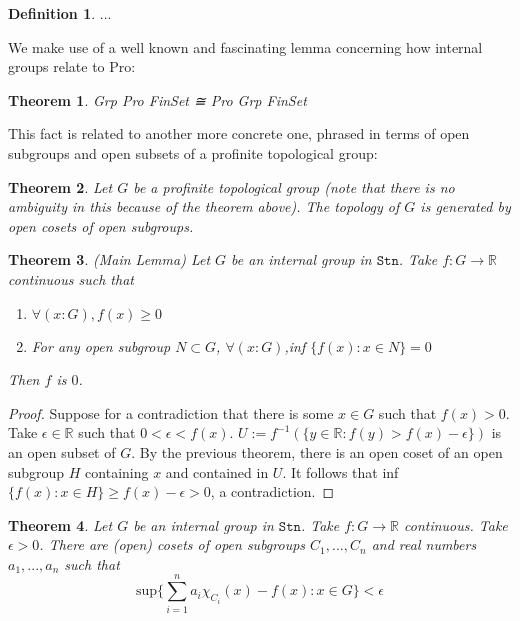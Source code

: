 \documentclass[13pt]{amsart}
\newtheorem{theorem}{Theorem}
\theoremstyle{definition}
\newtheorem{definition}{Definition}
\begin{document}
\begin{definition}
...
\end{definition}

We make use of a well known and fascinating lemma concerning how internal groups relate to Pro:

\begin{theorem}
Grp Pro FinSet ≅ Pro Grp FinSet
\end{theorem}

This fact is related to another more concrete one, phrased in terms of open subgroups and open subsets of a profinite topological group:

\begin{theorem}
Let $G$ be a profinite topological group (note that there is no ambiguity in this because of the theorem above). The topology of $G$ is generated by open cosets of open subgroups.
\end{theorem}

\begin{theorem} (Main Lemma)
Let $G$ be an internal group in $\texttt{Stn}$. Take $f : G \rightarrow \mathbb{R}$ continuous such that 
\begin{enumerate}
\item $\forall (x : G),f(x) \geq 0$
\item For any open subgroup $N \subset G$, $\forall (x:G)$,inf $\{ f(x) : x \in N \} = 0$
\end{enumerate}
Then $f$ is $0$.
\end{theorem}

\begin{proof}
Suppose for a contradiction that there is some $x \in G$ such that $f(x) > 0$. Take $\epsilon \in \mathbb{R}$ such that $0 < \epsilon < f(x)$. $U := f^{-1}(\{ y \in \mathbb{R} : f(y) > f(x) - \epsilon \})$ is an open subset of $G$. By the previous theorem, there is an open coset of an open subgroup $H$ containing $x$ and contained in $U$. It follows that inf $\{ f(x) : x \in H \} \geq f(x) - \epsilon > 0 $, a contradiction.
\end{proof}

\begin{theorem}
Let $G$ be an internal group in $\texttt{Stn}$. Take $f : G \rightarrow \mathbb{R}$ continuous. Take $\epsilon > 0$. There are (open) cosets of open subgroups $C_1, ...,C_n$ and real numbers $a_1, ..., a_n$ such that 
\[ \text{sup} \{  \sum_{i = 1}^{n} a_i \chi_{C_i}(x) - f(x) : x \in G \} < \epsilon \]
\end{theorem}
\end{document}
